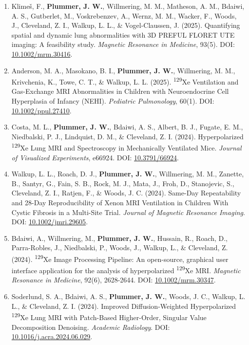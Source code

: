 \documentclass[11pt,]{scrartcl}
\begin{document}
\begin{enumerate}
    \item Klimeš, F., \textbf{Plummer, J. W.}, Willmering, M. M., Matheson, A. M., Bdaiwi, A. S., Gutberlet, M., Voskrebenzev, A., Wernz, M. M., Wacker, F., Woods, J., Cleveland, Z. I., Walkup, L. L., \& Vogel-Claussen, J. (2025). Quantifying spatial and dynamic lung abnormalities with 3D PREFUL FLORET UTE imaging: A feasibility study. \textit{Magnetic Resonance in Medicine}, 93(5). DOI: \href{https://doi.org/10.1002/mrm.30416}{10.1002/mrm.30416}.

    \item Anderson, M. A., Masokano, B. I., \textbf{Plummer, J. W.}, Willmering, M. M., Krivchenia, K., Towe, C. T., \& Walkup, L. L. (2025). \textsuperscript{129}Xe Ventilation and Gas-Exchange MRI Abnormalities in Children with Neuroendocrine Cell Hyperplasia of Infancy (NEHI). \textit{Pediatric Pulmonology}, 60(1). DOI: \href{https://doi.org/10.1002/ppul.27410}{10.1002/ppul.27410}.

    \item Costa, M. L., \textbf{Plummer, J. W.}, Bdaiwi, A. S., Albert, B. J., Fugate, E. M., Niedbalski, P. J., Lindquist, D. M., \& Cleveland, Z. I. (2024). Hyperpolarized \textsuperscript{129}Xe Lung MRI and Spectroscopy in Mechanically Ventilated Mice. \textit{Journal of Visualized Experiments}, e66924. DOI: \href{https://doi.org/10.3791/66924}{10.3791/66924}.

    \item Walkup, L. L., Roach, D. J., \textbf{Plummer, J. W.}, Willmering, M. M., Zanette, B., Santyr, G., Fain, S. B., Rock, M. J., Mata, J., Froh, D., Stanojevic, S., Cleveland, Z. I., Ratjen, F., \& Woods, J. C. (2024). Same-Day Repeatability and 28-Day Reproducibility of Xenon MRI Ventilation in Children With Cystic Fibrosis in a Multi-Site Trial. \textit{Journal of Magnetic Resonance Imaging}. DOI: \href{https://doi.org/10.1002/jmri.29605}{10.1002/jmri.29605}.

    \item Bdaiwi, A., Willmering, M., \textbf{Plummer, J. W.}, Hussain, R., Roach, D., Parra-Robles, J., Niedbalski, P., Woods, J., Walkup, L., \& Cleveland, Z. (2024). \textsuperscript{129}Xe Image Processing Pipeline: An open-source, graphical user interface application for the analysis of hyperpolarized \textsuperscript{129}Xe MRI. \textit{Magnetic Resonance in Medicine}, 92(6), 2628-2644. DOI: \href{https://doi.org/10.1002/mrm.30347}{10.1002/mrm.30347}.
  
    \item Soderlund, S. A., Bdaiwi, A. S., \textbf{Plummer, J. W.}, Woods, J. C., Walkup, L. L., \& Cleveland, Z. I. (2024). Improved Diffusion-Weighted Hyperpolarized \textsuperscript{129}Xe Lung MRI with Patch-Based Higher-Order, Singular Value Decomposition Denoising. \textit{Academic Radiology}. DOI: \href{https://doi.org/10.1016/j.acra.2024.06.029}{10.1016/j.acra.2024.06.029}.
  

\end{enumerate}
\end{document}
